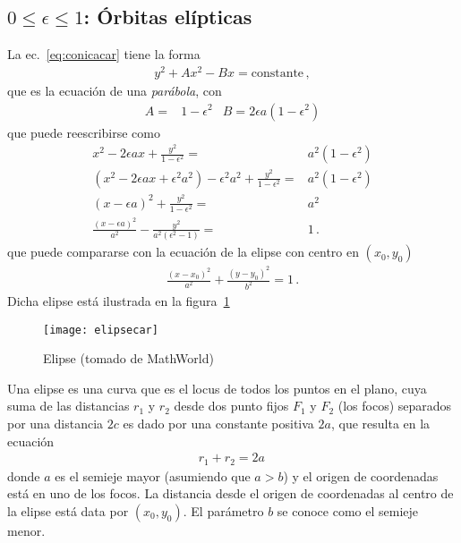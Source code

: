 \subsection{$0\le \epsilon\le 1$: Órbitas elípticas}
La ec.~\eqref{eq:conicacar} tiene la forma
\begin{align}
    y^2+A x^2-Bx=\text{constante}\,,
  \end{align}
que es la ecuación de una \emph{parábola}, con
\begin{align}
  A=&1-\epsilon^2& B=2\epsilon a(1-\epsilon^2)
\end{align}
que puede reescribirse como
\begin{align}
  \label{eq:eli1}
x^2-2\epsilon ax + \frac{y^2}{1-\epsilon^2}=&a^2(1-\epsilon^2)\nonumber\\
(x^2-2\epsilon ax+\epsilon^2a^2)-\epsilon^2a^2 + \frac{y^2}{1-\epsilon^2}=&a^2(1-\epsilon^2)\nonumber\\
(x-\epsilon a)^2+ \frac{y^2}{1-\epsilon^2}=&a^2\nonumber\\
\frac{(x-\epsilon a)^2}{a^2}-\frac{y^2}{a^2(\epsilon^2-1)}=&1\,.
\end{align}
que puede compararse con la ecuación de la elipse con centro en $(x_0,y_0)$
\begin{align}
  \label{eq:hip2}
\frac{(x-x_0)^2}{a^2}+\frac{(y-y_0)^2}{b^2}=1\,.
\end{align}
Dicha elipse está ilustrada en la figura~\ref{fig:elipsecar}
\begin{frame}
  

\begin{figure}
  \centering
  \texttt{[image: elipsecar]}
  \caption{Elipse (tomado de MathWorld)}
  \label{fig:elipsecar}
\end{figure}
\end{frame}
Una elipse es una curva que es el locus de todos los puntos en el plano, cuya suma de las distancias $r_1$ y $r_2$ desde dos punto fijos $F_1$ y $F_2$ (los focos) separados por una distancia $2c$ es dado por una constante positiva $2a$, que resulta en la ecuación
\begin{align}
  r_1+r_2=2a\,
\end{align}
donde $a$ es el semieje mayor (asumiendo que $a>b$) y el origen de coordenadas está en uno de los focos. La distancia desde el origen de coordenadas al centro de la elipse está data por $(x_0,y_0)$. El parámetro $b$ se conoce como el semieje menor.  


